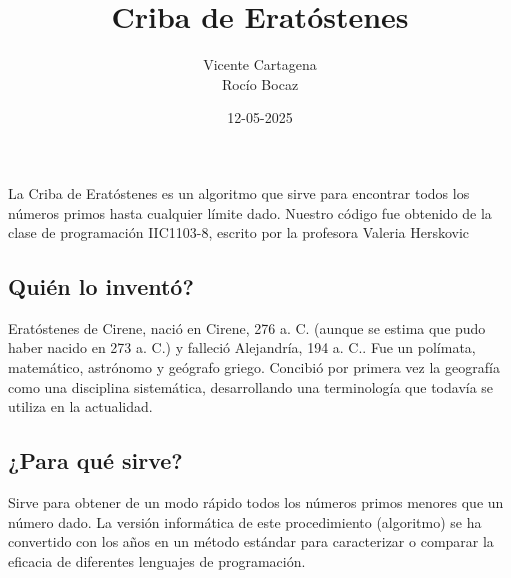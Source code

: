\documentclass{article}
\title{Criba de Eratóstenes}
\author{Vicente Cartagena\\Rocío Bocaz}
\date{12-05-2025}
\begin{document}
 
\maketitle
La Criba de Eratóstenes es un algoritmo que sirve para encontrar todos los números primos hasta cualquier límite dado.
Nuestro código fue obtenido de la clase de programación IIC1103-8, escrito por la profesora Valeria Herskovic
\subsection{Quién lo inventó?}
Eratóstenes de Cirene, nació en Cirene, 276 a. C. (aunque se estima que pudo haber nacido en 273 a. C.) y falleció Alejandría, 194 a. C.. Fue un polímata, matemático, astrónomo y geógrafo griego. Concibió por primera vez la geografía como una disciplina sistemática, desarrollando una terminología que todavía se utiliza en la actualidad.
\subsection{¿Para qué sirve?}
Sirve para obtener de un modo rápido todos los números primos menores que un número dado. La versión informática de este procedimiento (algoritmo) se ha convertido con los años en un método estándar para caracterizar o comparar la eficacia de diferentes lenguajes de programación.
\end{document}
